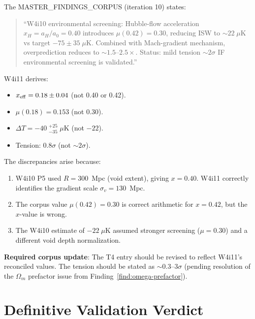 \documentclass[11pt,a4paper]{article}
\newcounter{findingctr}
\newenvironment{finding}[1][]{%
  \refstepcounter{findingctr}%
  \begin{tcolorbox}[colback=blue!3!white, colframe=blue!50!black,
    title=\textbf{Finding \thefindingctr: #1}]
}{%
  \end{tcolorbox}%
}
\newcommand{\mufd}{\mu}
\newcommand{\Omm}{\Omega_m}
\begin{document}
\begin{finding}[\textbf{MODERATE}: W4i10 Corpus Values Inconsistent
with W4i11]
\label{find:corpus-inconsistency}

The MASTER\_FINDINGS\_CORPUS (iteration 10) states:

\begin{quote}
``W4i10 environmental screening: Hubble-flow acceleration
$x_H = a_H/a_0 = 0.40$ introduces $\mufd(0.42) = 0.30$, reducing
ISW to $\sim 22\;\mu$K vs target $-75 \pm 35\;\mu$K. Combined with
Mach-gradient mechanism, overprediction reduces to $\sim 1.5$--$2.5\times$.
Status: mild tension $\sim 2\sigma$ IF environmental screening is
validated.''
\end{quote}

W4i11 derives:
\begin{itemize}[nosep]
\item $x_{\rm eff} = 0.18 \pm 0.04$ (not 0.40 or 0.42).
\item $\mufd(0.18) = 0.153$ (not 0.30).
\item $\Delta T = -40\;{}^{+25}_{-35}\;\mu$K (not $-22$).
\item Tension: $0.8\sigma$ (not $\sim 2\sigma$).
\end{itemize}

The discrepancies arise because:
\begin{enumerate}
\item W4i10 P5 used $R = 300$~Mpc (void extent), giving $x = 0.40$.
  W4i11 correctly identifies the gradient scale $\sigma_v = 130$~Mpc.
\item The corpus value $\mufd(0.42) = 0.30$ is correct arithmetic for
  $x = 0.42$, but the $x$-value is wrong.
\item The W4i10 estimate of $-22\;\mu$K assumed stronger screening
  ($\mufd = 0.30$) and a different void depth normalization.
\end{enumerate}

\textbf{Required corpus update}: The T4 entry should be revised
to reflect W4i11's reconciled values. The tension should be stated
as $\sim 0.3$--$3\sigma$ (pending resolution of the $\Omm$
prefactor issue from Finding~\ref{find:omega-prefactor}).
\end{finding}


\part{Definitive Validation Verdict}
\label{part:verdict}
\end{document}
